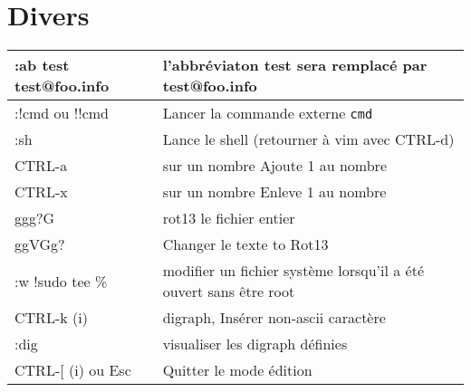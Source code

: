 \documentclass{article}
\begin{document}
                            \section{Divers}
                            \begin{tabular}{|p{4cm}| l| }
                                \hline
                                :ab test test@foo.info & l'abbréviaton test sera remplacé par test@foo.info \\ \hline
                                :!cmd ou !!cmd & Lancer la commande externe \verb?cmd?  \\ \hline
                                :sh & Lance le shell (retourner à vim avec CTRL-d) \\ \hline
                                CTRL-a &sur un nombre Ajoute 1 au nombre \\ \hline
                                CTRL-x &sur un nombre Enleve 1 au nombre \\ \hline
                                ggg?G   & rot13 le fichier entier \\ \hline
                                ggVGg? 	& Changer le texte to Rot13 \\ \hline
                                :w !sudo tee \% &  modifier un fichier système lorsqu'il a été ouvert sans être root \\ \hline
                                CTRL-k (i) & digraph, Insérer non-ascii caractère \\ \hline
                                :dig & visualiser les digraph définies \\ \hline
                                CTRL-[ (i) ou Esc & Quitter le mode édition \\ \hline 
                            \end{tabular}\\

                            
\end{document}
